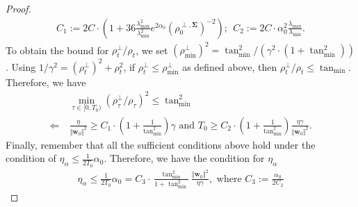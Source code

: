 \documentclass[pdflatex,sn-basic]{sn-jnl}%
\theoremstyle{thmstyleone}%
\begin{document}
\begin{appendices}
\begin{proof}
  \begin{equation*}
  \begin{aligned}
    C_1 := 
    2 C \cdot
      \left(
      1 + 36 
      \frac{ \lambda_{\max}^2}{\lambda_{\min}^2}
      e^{2\alpha_0}
      \left(
        \rho_0^{\perp, \mathbf{\Sigma}}
      \right)^{-2}
    \right);
    \ \ 
    C_2 := 
    2 C \cdot
    \alpha_{0}^2 \frac{\lambda_{\max}}{\lambda_{\min}}
    .
  \end{aligned}
  \end{equation*}
  To obtain the bound for $\rho_t^{\perp} / \rho_t$, we set $\left(\rho_{\min}^{\perp}\right)^2 = 
  {\tan_{\min}^2}/\left(\gamma^2 \cdot \left(1 + \tan_{\min}^2\right)\right)$. 
  Using $1/\gamma^2 = \left(\rho_t^{\perp}\right)^2 + \rho_t^2$, if $\rho_t^{\perp} \leq \rho_{\min}^{\perp}$ 
  as defined above, then $\rho_t^{\perp} / \rho_t \leq \tan_{\min}$. Therefore, we have 
  \begin{equation*}
  \begin{aligned}
    & \ \min_{\tau \in [0, T_0)} 
    \left(
      \rho_{\tau}^{\perp} / \rho_{\tau}
    \right)^2 
     \le
      \tan_{\min}^{2}
    \\  \boldsymbol{\Leftarrow} & \ 
    \frac{\eta}{\Vert \mathbf{w}_0 \Vert^2} \ge C_1 \cdot \left(1 + \frac{1}{\tan_{\min}^2}\right)
    \gamma
    \text{ and }
    T_0 \ge C_2 \cdot \left(1 + \frac{1}{\tan_{\min}^2}\right) \frac{\eta \gamma}{\Vert \mathbf{w}_0 \Vert^2}.
  \end{aligned}
  \end{equation*}
  Finally, remember that all the sufficient conditions above hold under the condition of $\eta_{\alpha} \le \frac{1}{2 T_0} \alpha_0$. 
  Therefore, we have the condition for $\eta_{\alpha}$
  \begin{equation*}
  \begin{aligned}
    \eta_{\alpha} \le 
    \frac{1}{2 T_0} \alpha_0
    =
    C_3 \cdot \frac{\tan_{\min}^2}{1 + \tan_{\min}^2}
    \frac{\Vert \mathbf{w}_0 \Vert^2}{\eta \gamma}
    ,
    \text{ where }
    C_3 := \frac{\alpha_0}{2 C_2}
  \end{aligned}
  \end{equation*}
\end{proof}



\end{appendices}
\end{document}
